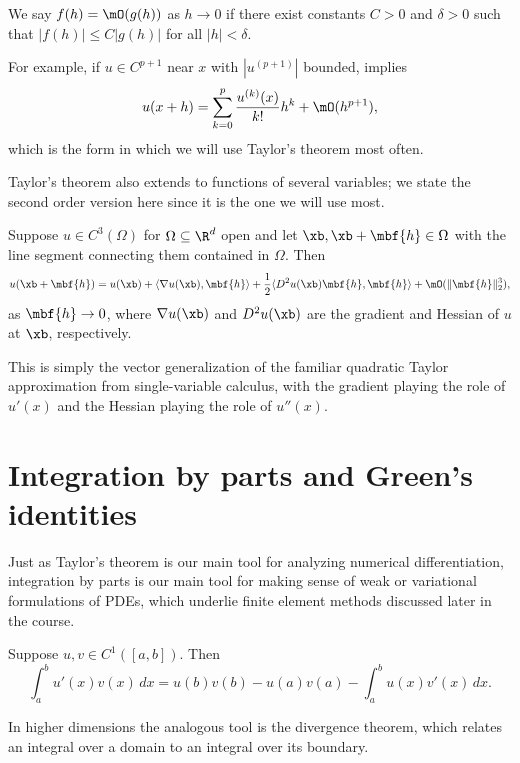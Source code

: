 \begin{definition}
    We say $f(h) = \mO(g(h))$ as $h \to 0$ if there exist constants $C >
    0$ and $\delta > 0$ such that $|f(h)| \le C |g(h)|$ for all $|h| <
    \delta$.
\end{definition}
For example, if $u \in C^{p+1}$ near $x$ with $|u^{(p+1)}|$ bounded,
 implies
\begin{equation*}
    u(x+h) = \sum_{k=0}^p \frac{u^{(k)}(x)}{k!} h^k + \mO(h^{p+1}),
\end{equation*}
which is the form in which we will use Taylor's theorem most often.

Taylor's theorem also extends to functions of several variables; we
state the second order version here since it is the one we will use
most.

\begin{theorem}
    Suppose $u \in C^3(\Omega)$ for $\Omega \subseteq \R^d$ open and let
    $\xb, \xb + \mbf{h} \in \Omega$ with the line segment connecting them
    contained in $\Omega$. Then
    \begin{equation*}
        u(\xb + \mbf{h}) = u(\xb) + \langle \nabla u(\xb), \mbf{h} \rangle +
        \frac12 \langle D^2 u(\xb) \mbf{h}, \mbf{h} \rangle + \mO(\|\mbf{h}\|_2^3),
    \end{equation*}
    as $\mbf{h} \to 0$, where $\nabla u(\xb)$ and $D^2 u(\xb)$ are the
    gradient and Hessian of $u$ at $\xb$, respectively.
\end{theorem}
This is simply the vector generalization of the familiar quadratic
Taylor approximation from single-variable calculus, with the gradient
playing the role of $u'(x)$ and the Hessian playing the role of
$u''(x)$.


\section{Integration by parts and Green's identities}

Just as Taylor's theorem is our main tool for analyzing numerical
differentiation, integration by parts is our main tool for making sense
of weak or variational formulations of PDEs, which underlie finite
element methods discussed later in the course.

\begin{theorem}
    Suppose $u, v \in C^1([a,b])$. Then
    \begin{equation*}
        \int_a^b u'(x) v(x) \, dx = u(b)v(b) - u(a)v(a) -
        \int_a^b u(x) v'(x) \, dx.
    \end{equation*}
\end{theorem}
In higher dimensions the analogous tool is the divergence theorem,
which relates an integral over a domain to an integral over its
boundary.

